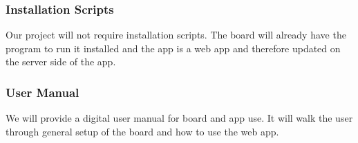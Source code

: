\subsubsection{Installation Scripts}
Our project will not require installation scripts. The board will already have the program to run it installed and the app is a web app and therefore updated on the server side of the app.

\subsubsection{User Manual}
We will provide a digital user manual for board and app use. It will walk the user through general setup of the board and how to use the web app.
